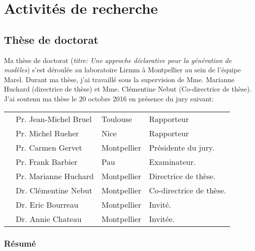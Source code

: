 \section{Activités de recherche}

\subsection{Thèse de doctorat}

Ma thèse de doctorat ({\it titre: Une approche déclarative pour la génération de modèles}) s'est déroulée au laboratoire Lirmm à Montpellier au sein de l'équipe Marel. Durant ma thèse, j'ai travaillé sous la supervision de Mme. Marianne Huchard (directrice de thèse) et Mme. Clémentine Nebut (Co-directrice de thèse). J'ai soutenu ma thèse le 20 octobre 2016 en présence du jury suivant:

\begin{tabular}{m{1cm}@{$-~$}lll}
&Pr. Jean-Michel Bruel& Toulouse    & Rapporteur \\
&Pr. Michel Rueher    & Nice        & Rapporteur \\
&Pr. Carmen Gervet    & Montpellier & Présidente du jury.\\
&Pr. Frank Barbier    & Pau         & Examinateur. \\
&Pr. Marianne Huchard & Montpellier & Directrice de thèse.\\
&Dr. Clémentine Nebut & Montpellier & Co-directrice de thèse.\\
&Dr. Eric Bourreau    & Montpellier & Invité. \\
&Dr. Annie Chateau    & Montpellier & Invitée.\\
\end{tabular}


\subsubsection*{Résumé}

